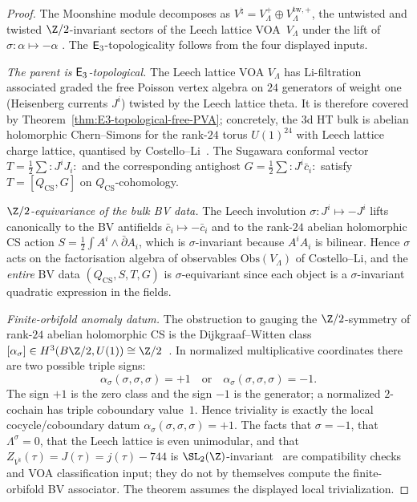 \begin{proof}
The Moonshine module decomposes as
$V^\natural = V_\Lambda^+ \oplus V_\Lambda^{\mathrm{tw},+}$,
the untwisted and twisted $\Z/2$-invariant sectors of the
Leech lattice VOA~$V_\Lambda$ under the lift of
$\sigma\colon \alpha \mapsto -\alpha$
\cite{FLM88}. The $\mathsf{E}_3$-topologicality follows from the
four displayed inputs.

\emph{The parent is $\mathsf{E}_3$-topological.} The Leech
lattice VOA $V_\Lambda$ has Li-filtration associated graded
the free Poisson vertex algebra on $24$ generators of weight
one (Heisenberg currents $J^i$) twisted by the Leech lattice
theta. It is therefore covered by
Theorem~\ref{thm:E3-topological-free-PVA}; concretely, the
$3$d HT bulk is abelian holomorphic Chern--Simons for the
rank-$24$ torus $U(1)^{24}$ with Leech lattice charge lattice,
quantised by Costello--Li~\cite{CL16}. The Sugawara
conformal vector $T = \tfrac{1}{2}\sum {:}J^i J_i{:}$ and the
corresponding antighost $G = \tfrac{1}{2}\sum {:}J^i \bar c_i{:}$
satisfy $T = [Q_{\mathrm{CS}}, G]$ on $Q_{\mathrm{CS}}$-cohomology.

\emph{$\Z/2$-equivariance of the bulk BV data.}
The Leech involution $\sigma\colon J^i \mapsto -J^i$ lifts
canonically to the BV antifields $\bar c_i \mapsto -\bar c_i$
and to the rank-$24$ abelian holomorphic CS action
$S = \tfrac{1}{2}\int A^i \wedge \bar\partial A_i$, which is
$\sigma$-invariant because $A^i A_i$ is bilinear. Hence
$\sigma$ acts on the factorisation algebra of observables
$\mathrm{Obs}(V_\Lambda)$ of Costello--Li, and the
\emph{entire} BV data $(Q_{\mathrm{CS}}, S, T, G)$ is
$\sigma$-equivariant since each object is a $\sigma$-invariant
quadratic expression in the fields.

\emph{Finite-orbifold anomaly datum.} The obstruction to
gauging the $\Z/2$-symmetry of rank-$24$ abelian holomorphic CS is the
Dijkgraaf--Witten class
$[\alpha_\sigma] \in H^3(B\Z/2, U(1)) \cong \Z/2$~\cite{DW90}. In
normalized multiplicative coordinates there are two possible triple
signs:
\[
\alpha_\sigma(\sigma,\sigma,\sigma)=+1
\quad\text{or}\quad
\alpha_\sigma(\sigma,\sigma,\sigma)=-1.
\]
The sign \(+1\) is the zero class and the sign \(-1\) is the generator;
a normalized $2$-cochain has triple coboundary value~\(1\). Hence
triviality is exactly the local cocycle/coboundary datum
\(\alpha_\sigma(\sigma,\sigma,\sigma)=+1\). The facts that
\(\sigma=-1\), that \(\Lambda^\sigma=0\), that the Leech lattice is
even unimodular, and that
$Z_{V^\natural}(\tau)=J(\tau)=j(\tau)-744$ is
$\SL_2(\Z)$-invariant~\cite{Borcherds92} are compatibility checks and
VOA classification input; they do not by themselves compute the
finite-orbifold BV associator. The theorem assumes the displayed local
trivialization.


\end{proof}
